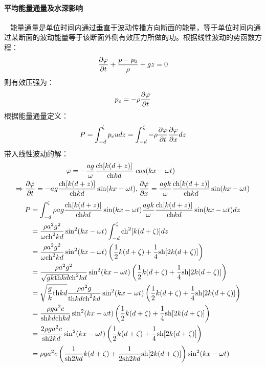 \documentclass[a4paper,12pt]{article}
\begin{document}
	\paragraph{平均能量通量及水深影响}~{
    }
	能量通量是单位时间内通过垂直于波动传播方向断面的能量，等于单位时间内通过某断面的波动能量等于该断面外侧有效压力所做的功。根据线性波动的势函数方程：
	\[
	{{\partial \varphi } \over {\partial t}} + {{p - {p_0}} \over \rho } + gz = 0
	\]
	\indent
	则有效压强为：
	\[
	{p_e} =  - \rho {{\partial \varphi } \over {\partial t}}
	\]
	\indent
	根据能量通量定义：
	\[
	P = \int_{ - d}^\zeta  {{p_e}udz} = \int_{ - d}^\zeta  { - \rho {{\partial \varphi } \over {\partial t}}{{\partial \varphi } \over {\partial x}}dz} 
	\]
	带入线性波动的解：
	\[
	\begin{aligned}
	\varphi  =  - {{ag} \over \omega }{{{\rm{ch}} [k(d + z)]} \over {{\rm{ch}} kd}}\ & cos (kx - \omega t)\\
	\Rightarrow\frac{\partial\varphi}{\partial t}=-ag\frac{{\rm ch}[k(d+z)]}{{\rm ch}kd}\sin (kx-\omega t) &, \frac{\partial\varphi}{\partial x}={{agk} \over \omega }{{{\rm{ch}} [k(d + z)]} \over {{\rm{ch}} kd}}\sin (kx - \omega t)
	\end{aligned}
	\]
	\[
	\begin{aligned}
	P &= \int_{ - d}^\zeta  { \rho ag\frac{{\rm ch}[k(d+z)]}{{\rm ch}kd}\sin (kx-\omega t) {{agk} \over \omega }{{{\rm{ch}} [k(d + z)]} \over {{\rm{ch}} kd}}\sin (kx - \omega t)dz} \\
	&=\frac{\rho a^2g^2}{\omega {\rm ch}^2kd}\sin^2(kx-\omega t)\int_{-d}^\zeta {{\rm ch}^2[k(d+\zeta)]}dz\\
	&=\frac{\rho a^2g^2}{\omega {\rm ch}^2kd}\sin^2(kx-\omega t)\left( \frac{1}{2}k(d+\zeta)+\frac{1}{4}{\rm sh}[2k(d+\zeta)]\right)	\\
	&=\frac{\rho a^2g^2}{\sqrt{gk{\rm th}kd} {\rm ch}^2kd}\sin^2(kx-\omega t)\left( \frac{1}{2}k(d+\zeta)+\frac{1}{4}{\rm sh}[2k(d+\zeta)]\right)	\\
	&=\sqrt{\frac{g}{k}{\rm th}kd}\frac{\rho a^2g}{{\rm th} kd {\rm ch}^2kd}\sin^2(kx-\omega t)\left( \frac{1}{2}k(d+\zeta)+\frac{1}{4}{\rm sh}[2k(d+\zeta)]\right)	\\
	&=\frac{\rho g a^2 c}{{\rm sh} kd {\rm ch}kd}\sin^2(kx-\omega t)\left( \frac{1}{2}k(d+\zeta)+\frac{1}{4}{\rm sh}[2k(d+\zeta)]\right)	\\
	&=\frac{2\rho g a^2 c}{{\rm sh} 2kd}\sin^2(kx-\omega t)\left( \frac{1}{2}k(d+\zeta)+\frac{1}{4}{\rm sh}[2k(d+\zeta)]\right)	\\
	&={\rho g a^2 c}\left( \frac{1}{{\rm sh}2kd}k(d+\zeta)+\frac{1}{2{\rm sh}2kd}{\rm sh}[2k(d+\zeta)]\right)\sin^2(kx-\omega t)	\\
	\end{aligned}
	\]
\end{document}
